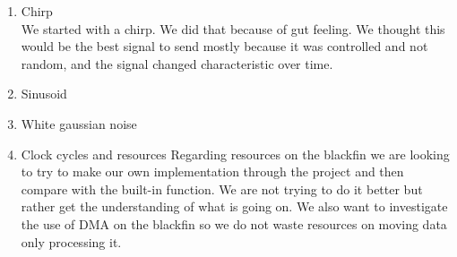 \begin{enumerate}
\item Chirp\\
We started with a chirp. We did that because of gut feeling. We thought this would be the best signal to send mostly because it was controlled and not random, and the signal changed characteristic over time.
\item Sinusoid
\item White gaussian noise



\item Clock cycles and resources
Regarding resources on the blackfin we are looking to try to make our own implementation through the project and then compare with the built-in function. We are not trying to do it better but rather get the understanding of what is going on.
We also want to investigate the use of DMA on the blackfin so we do not waste resources on moving data only processing it.

\end{enumerate}
